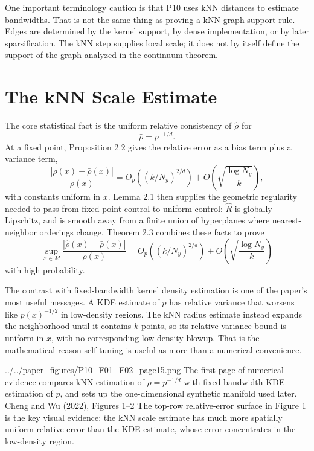 \documentclass[11pt]{article}
\begin{document}
One important terminology caution is that P10 uses kNN distances to estimate
bandwidths. That is not the same thing as proving a kNN graph-support rule.
Edges are determined by the kernel support, by dense implementation, or by
later sparsification. The kNN step supplies local scale; it does not by itself
define the support of the graph analyzed in the continuum theorem.

\section{The kNN Scale Estimate}

The core statistical fact is the uniform relative consistency of
\(\widehat\rho\) for
\[
  \bar\rho=p^{-1/d}.
\]
At a fixed point, Proposition 2.2 gives the relative error as a bias term plus
a variance term,
\[
  \frac{|\widehat\rho(x)-\bar\rho(x)|}{\bar\rho(x)}
  =
  O_p\!\left((k/N_y)^{2/d}\right)
  +
  O\!\left(\sqrt{\frac{\log N_y}{k}}\right),
\]
with constants uniform in \(x\). Lemma 2.1 then supplies the geometric
regularity needed to pass from fixed-point control to uniform control:
\(\widehat R\) is globally Lipschitz, and is smooth away from a finite union
of hyperplanes where nearest-neighbor orderings change. Theorem 2.3 combines
these facts to prove
\[
  \sup_{x\in M}
  \frac{|\widehat\rho(x)-\bar\rho(x)|}{\bar\rho(x)}
  =
  O_p\!\left((k/N_y)^{2/d}\right)
  +
  O\!\left(\sqrt{\frac{\log N_y}{k}}\right)
\]
with high probability.

The contrast with fixed-bandwidth kernel density estimation is one of the
paper's most useful messages. A KDE estimate of \(p\) has relative variance
that worsens like \(p(x)^{-1/2}\) in low-density regions. The kNN radius
estimate instead expands the neighborhood until it contains \(k\) points, so
its relative variance bound is uniform in \(x\), with no corresponding
low-density blowup. That is the mathematical reason self-tuning is useful as
more than a numerical convenience.

\paperfigure
  {../../paper_figures/P10_F01_F02_page15.png}
  {The first page of numerical evidence compares kNN estimation of
  \(\bar\rho=p^{-1/d}\) with fixed-bandwidth KDE estimation of \(p\), and
  sets up the one-dimensional synthetic manifold used later.}
  {Cheng and Wu (2022), Figures 1--2}
  {The top-row relative-error surface in Figure 1 is the key visual evidence:
  the kNN scale estimate has much more spatially uniform relative error than
  the KDE estimate, whose error concentrates in the low-density region.}
\end{document}
